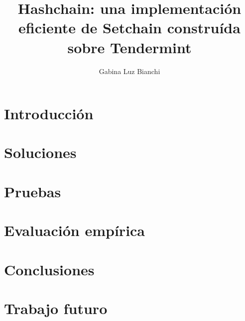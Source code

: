 \documentclass[12pt, oneside]{book}
\title{Hashchain: una implementación eficiente de Setchain construída sobre Tendermint}
\author{Gabina Luz Bianchi}
\begin{document}
\maketitle



\tableofcontents{}

\chapter{Introducción}





\chapter{Soluciones}


\chapter{Pruebas}


\chapter{Evaluación empírica}


\chapter{Conclusiones}


\chapter{Trabajo futuro}







% 
\end{document}
